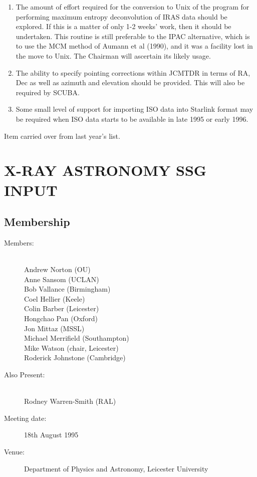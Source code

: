 \begin{enumerate}
\item The amount of effort required for the conversion to Unix of the 
program for performing maximum entropy deconvolution of IRAS data
should be explored. If this is a matter of only 1-2 weeks' work, then
it should be undertaken. This routine is still preferable to the IPAC
alternative, which is to use the MCM method of Aumann et al (1990),
and it was a facility lost in the move to Unix. The Chairman will
ascertain its likely usage.

\item The ability to specify pointing corrections within JCMTDR in
terms of RA, Dec as well as azimuth and elevation should be
provided. This will also be required by SCUBA.

\item Some small level of support for importing ISO data into Starlink
format may be required when ISO data starts to be available in late
1995 or early 1996.

\end{enumerate}
{\small *Item carried over from last year's list.}

\newpage
\section{X-RAY ASTRONOMY SSG INPUT}

\subsection{Membership}

\begin{description}
\item[Members:]\mbox{}\\
Andrew Norton (OU)\\
Anne Sansom (UCLAN)\\
Bob Vallance (Birmingham)\\
Coel Hellier (Keele)\\
Colin Barber (Leicester)\\
Hongchao Pan (Oxford)\\
Jon Mittaz (MSSL)\\
Michael Merrifield (Southampton)\\
Mike Watson (chair, Leicester)\\
Roderick Johnstone (Cambridge)

\item[Also Present:]\mbox{}\\
Rodney Warren-Smith (RAL)

\item[Meeting date:]18th August 1995

\item[Venue:]Department of Physics and Astronomy, Leicester University
\end{description}

